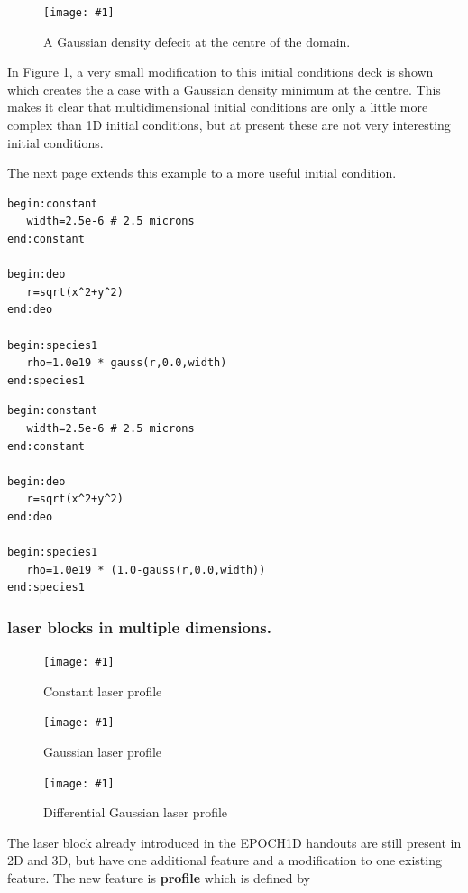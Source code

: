 \documentclass[12pt,a4paper]{article}
\newcommand{\boxverbatim}[1]{\begin{Verbatim}[obeytabs=true,frame=single,
  framerule=0.5mm,rulecolor=\color{warwickmid},formatcom=\color{black},label=#1]}
\newcommand{\inlineemph}[1]{{\color{warwicklight} \bf{#1}}}
\newcommand{\scaledcapimage}[4]
  {{\begin{figure}[hbt!]\centering\texttt{[image: \#1]}\caption{#3}
    \label{#2} \end{figure}}}
\begin{document}
\scaledcapimage{./images/invgaussic}{inversegaussblob}{A Gaussian density
defecit at the centre of the domain.}{0.4}

In Figure \ref{inversegaussblob}, a very small modification to this initial
conditions deck is shown which creates the a case with a Gaussian density
minimum at the centre. This makes it clear that multidimensional initial
conditions are only a little more complex than 1D initial conditions, but at
present these are not very interesting initial conditions.

The next page extends this example to a more useful initial condition.\\
%
\begin{minipage}{\textwidth}
\boxverbatim{species block to set up Gaussian density blob}
begin:constant
   width=2.5e-6 # 2.5 microns
end:constant

begin:deo
   r=sqrt(x^2+y^2)
end:deo

begin:species1
   rho=1.0e19 * gauss(r,0.0,width)
end:species1
\end{Verbatim}
\end{minipage}
%
\begin{minipage}{\textwidth}
\boxverbatim{species block to set up Gaussian density blob}
begin:constant
   width=2.5e-6 # 2.5 microns
end:constant

begin:deo
   r=sqrt(x^2+y^2)
end:deo

begin:species1
   rho=1.0e19 * (1.0-gauss(r,0.0,width))
end:species1
\end{Verbatim}
\end{minipage}

\subsubsection{\inlineemph{laser} blocks in multiple dimensions.}

\scaledcapimage{./images/profile_flat}{flatlaser}{Constant laser
profile}{0.4} \scaledcapimage{./images/profile_gauss}{gausslaser}{Gaussian
laser profile}{0.4}
\scaledcapimage{./images/profile_diff_gauss}{diffgausslaser}{Differential
Gaussian laser profile}{0.4}

The laser block already introduced in the EPOCH1D handouts are still present in
2D and 3D, but have one additional feature and a modification to one existing
feature. The new feature is \inlineemph{profile} which is defined
by\\
\end{document}
